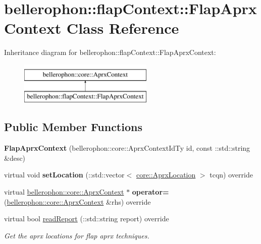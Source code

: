 \hypertarget{classbellerophon_1_1flapContext_1_1FlapAprxContext}{}\section{bellerophon\+:\+:flap\+Context\+:\+:Flap\+Aprx\+Context Class Reference}
\label{classbellerophon_1_1flapContext_1_1FlapAprxContext}
Inheritance diagram for bellerophon\+:\+:flap\+Context\+:\+:Flap\+Aprx\+Context\+:\begin{figure}[H]
\begin{center}
\leavevmode
\includegraphics[height=2.000000cm]{classbellerophon_1_1flapContext_1_1FlapAprxContext}
\end{center}
\end{figure}
\subsection*{Public Member Functions}
\begin{DoxyCompactItemize}
\item 
\hypertarget{classbellerophon_1_1flapContext_1_1FlapAprxContext_a3db0cbccbefa15530deadffe922feebf}{}\label{classbellerophon_1_1flapContext_1_1FlapAprxContext_a3db0cbccbefa15530deadffe922feebf} 
{\bfseries Flap\+Aprx\+Context} (bellerophon\+::core\+::\+Aprx\+Context\+Id\+Ty id, const \+::std\+::string \&desc)
\item 
\hypertarget{classbellerophon_1_1flapContext_1_1FlapAprxContext_aea7d98ebcd3002914d32d69900866abd}{}\label{classbellerophon_1_1flapContext_1_1FlapAprxContext_aea7d98ebcd3002914d32d69900866abd} 
virtual void {\bfseries set\+Location} (\+::std\+::vector$<$ \hyperlink{structbellerophon_1_1core_1_1AprxLocation}{core\+::\+Aprx\+Location} $>$ tcqn) override
\item 
\hypertarget{classbellerophon_1_1flapContext_1_1FlapAprxContext_a4a523fe7bd877b30a1478a336565f058}{}\label{classbellerophon_1_1flapContext_1_1FlapAprxContext_a4a523fe7bd877b30a1478a336565f058} 
virtual \hyperlink{classbellerophon_1_1core_1_1AprxContext}{bellerophon\+::core\+::\+Aprx\+Context} $\ast$ {\bfseries operator=} (\hyperlink{classbellerophon_1_1core_1_1AprxContext}{bellerophon\+::core\+::\+Aprx\+Context} \&rhs) override
\item 
virtual bool \hyperlink{classbellerophon_1_1flapContext_1_1FlapAprxContext_a3198868b5a8708c4976db9f1a70e70d5}{read\+Report} (\+::std\+::string report) override
\begin{DoxyCompactList}\small\item\em Get the aprx locations for flap aprx techniques. \end{DoxyCompactList}\end{DoxyCompactItemize}
